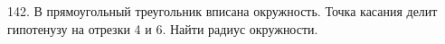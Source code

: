 142. В прямоугольный треугольник вписана окружность. Точка касания делит гипотенузу на отрезки 4 и 6. Найти радиус окружности.\\

